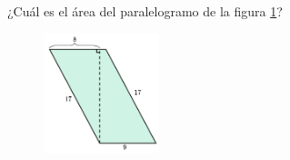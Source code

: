 \question[15]  ¿Cuál es el \'area del paralelogramo de la figura \ref{fig:area_compuesta_01}?
\begin{figure}[H]
    \begin{center}
        \includegraphics[width=0.3\textwidth]{../images/area_compuesta_01.png}
    \end{center}
    \caption{}
    \label{fig:area_compuesta_01}
\end{figure}